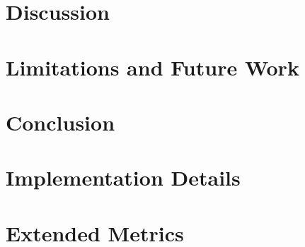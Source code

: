 \documentclass[11pt,a4paper]{article}
\begin{document}
\section{Discussion}


\section{Limitations and Future Work}


\section{Conclusion}





\appendix
\section{Implementation Details}


\section{Extended Metrics}

\end{document}
